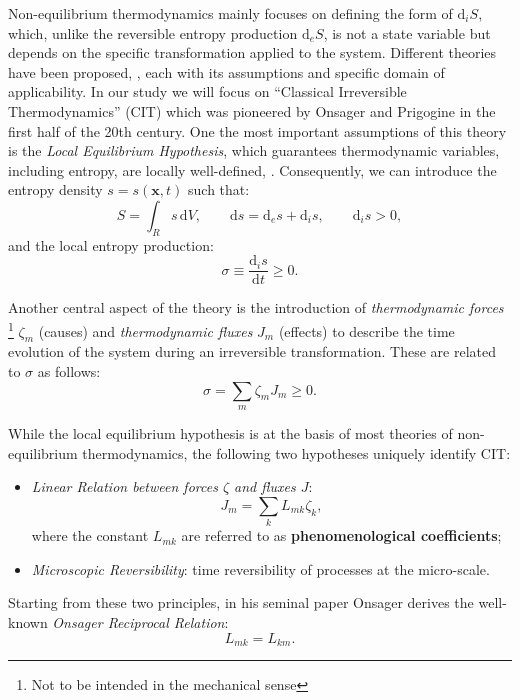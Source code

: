\documentclass[runningheads]{llncs}
\renewcommand{\d}{\ensuremath{\text{d}}}
\begin{document}
Non-equilibrium thermodynamics mainly focuses on defining the form of $\d_i S$, which, unlike the reversible entropy production $\d_e S$, is not a state variable but depends on the specific transformation applied to the system. 
Different theories have been proposed, \cite{NET}, each with its assumptions and specific domain of applicability. In our study we will focus on \textquotedblleft Classical Irreversible Thermodynamics'' (CIT) which was pioneered by Onsager \cite{onsager} and Prigogine \cite{prigogine} in the first half of the 20th century. One the most important assumptions of this theory is the \textit{Local Equilibrium Hypothesis}, which guarantees thermodynamic variables, including entropy, are locally well-defined, \cite{NET}. 
Consequently, we can introduce the entropy density $s=s(\mathbf{x},t)$ such that:
\begin{equation}
S = \int_{R} s \,\d V, \qquad \d s = \d_e s + \d_is, \qquad \d_is > 0, 
\end{equation}
and the local entropy production:
\begin{equation}
\sigma \equiv \frac{\d_i s}{\d t} \geq 0.
\end{equation}

Another central aspect of the theory is the introduction of \textit{thermodynamic forces} \footnote{Not to be intended in the mechanical sense} $\zeta_m$ (causes) and \textit{thermodynamic fluxes} $J_m$ (effects) to describe the time evolution of the system during an irreversible transformation. These are related to $\sigma$ as follows:
\begin{equation}
\sigma = \sum_m \zeta_m J_m\geq 0.
\label{2law}
\end{equation}

While the local equilibrium hypothesis is at the basis of most theories of non-equilibrium thermodynamics, the following two hypotheses uniquely identify CIT:
\begin{itemize}
	\item[1.] \textit{Linear Relation between forces $\zeta$ and fluxes $J$}:
	\begin{equation}
	J_m = \sum_k L_{mk} \zeta_k,\label{lin}
	\end{equation}
	where the constant $L_{mk}$ are referred to as \textbf{phenomenological coefficients};
	\item[2.] \textit{Microscopic Reversibility}: time reversibility of processes at the micro-scale. 
\end{itemize}

Starting from these two principles, in his seminal paper \cite{onsager} Onsager derives the well-known \textit{Onsager Reciprocal Relation}:
\begin{equation}
L_{mk}=L_{km}.
\end{equation}
\end{document}

